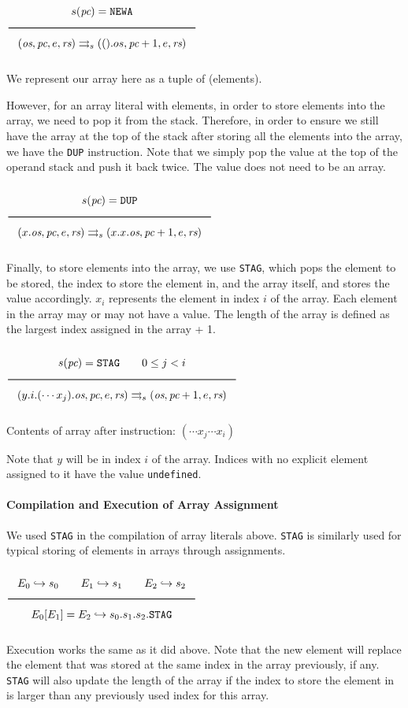 $\Rule{s(\textit{pc}) = \texttt{NEWA}}{
(\textit{os},\textit{pc},e,\textit{rs}) \transition
(().os,\textit{pc}+1,e,\textit{rs})}
$

We represent our array here as a tuple of (elements).

However, for an array literal with elements, in order to store elements
into the array, we need to pop it from the stack. Therefore, in order
to ensure we still have the array at the top of the stack after storing
all the elements into the array, we have the \texttt{DUP} instruction.
Note that we simply pop the value at the top of the operand stack
and push it back twice. The value does not need to be an array.

$\Rule{s(\textit{pc}) = \texttt{DUP}}{
(x.\textit{os},\textit{pc},e,\textit{rs}) \transition
(x.x.\textit{os},\textit{pc}+1,e,\textit{rs})}
$

Finally, to store elements into the array, we use \texttt{STAG}, which pops the
element to be stored, the index to store the element in, and the array
itself, and stores the value accordingly. $x_i$ represents the element
in index $i$ of the array. Each element in the array may or may not have
a value. The length of the array is defined as the largest
index assigned in the array + 1.

$\Rule{s(\textit{pc}) = \texttt{STAG}\qquad 0 \leq j < i}{
(y.i.(\cdots x_j).\textit{os},\textit{pc},e,\textit{rs})
\transition (\textit{os},\textit{pc}+1,e,\textit{rs})}
$

Contents of array after instruction: $(\cdots x_j \cdots x_i)$

Note that $y$ will be in index $i$ of the array. Indices with no explicit
element assigned to it have the value \texttt{undefined}.

\paragraph{Compilation and Execution of Array Assignment}
We used \texttt{STAG} in the compilation of array literals
above. \texttt{STAG} is similarly used for typical storing of elements in
arrays through assignments.

$\Rule{
E_0 \translateaux s_0 \qquad E_1 \translateaux s_1 \qquad E_2 \translateaux s_2}
{E_0\lbrack E_1\rbrack = E_2 \translateaux s_0.s_1.s_2.\texttt{STAG}}
$

Execution works the same as it did above. Note that the new element will replace
the element that was stored at the same index in the array previously, if any.
\texttt{STAG} will also update the length of the array if the index to
store the element in is larger than any previously used index for this array.

